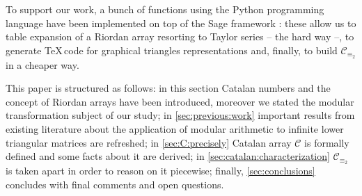 To support our work, a bunch of functions using the Python 
programming language have been implemented on top of the Sage framework 
\cite{sage}: these allow us to table expansion of a Riordan array
resorting to Taylor series -- the hard way --, to generate \TeX\,code
for graphical triangles representations and, finally, to build $\mathcal{C}_{\equiv_{2}}$ 
in a cheaper way.



This paper is structured as follows: in this section 
Catalan numbers and the concept of Riordan arrays have been introduced, moreover we stated the modular
transformation subject of our study; in \autoref{sec:previous:work} important
results from existing literature about the application of modular
arithmetic to infinite lower triangular matrices are refreshed;
in \autoref{sec:C:precisely} Catalan array $\mathcal{C}$ is formally defined
and some facts about it are derived; 
in \autoref{sec:catalan:characterization} $\mathcal{C}_{\equiv_{2}}$ is taken apart 
in order to reason on it piecewise; finally, \autoref{sec:conclusions} concludes
with final comments and open questions.

